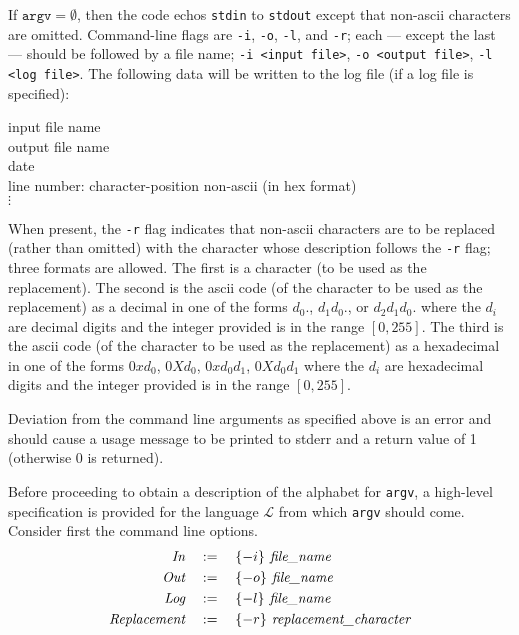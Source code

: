 \documentclass[12pt]{article}
\newcommand{\tab}{\hspace*{2em}}
\newcommand{\mtab}{\hspace*{1em}}
\newcommand{\as}[1] {\begin{align*}#1\end{align*}}
\newcommand{\adef}{&\mtab:=\mtab}
\begin{document}
\tab\begin{minipage}{\linewidth-12\fboxsep}
    If $ \texttt{argv} = \emptyset $, then the code echos \texttt{stdin} to \texttt{stdout} except 
    that non-ascii characters are omitted. Command-line flags are \texttt{-i}, \texttt{-o}, \texttt{-l}, 
    and \texttt{-r}; each --- except the last --- should be followed by a file name; \texttt{-i <input file>}, 
    \texttt{-o <output file>}, \texttt{-l <log file>}. The following data will be written to the log file 
    (if a log file is specified): \bigskip

    \tab\tab\begin{minipage}{\linewidth-24\fboxsep}
        input file name \\
        output file name \\
        date \\
        line number: character-position non-ascii (in hex format) \\
        \tab $ \vdots $
    \end{minipage} \hfill \bigskip \bigskip

    When present, the \texttt{-r} flag indicates that non-ascii characters are to be replaced (rather
    than omitted) with the character whose description follows the \texttt{-r} flag; three formats
    are allowed. The first is a character (to be used as the replacement). The second is the
    ascii code (of the character to be used as the replacement) as a decimal in one of the forms 
    $ d_0 . $, $ d_1 d_0 . $, or $ d_2 d_1 d_0 . $ where the $ d_i $ are decimal digits and the integer 
    provided is in the range $ [0, 255] $. The third is the ascii code (of the character to be used as the replacement) 
    as a hexadecimal in one of the forms $ 0x d_0 $, $ 0X d_0 $, $ 0x d_0 d_1 $, $ 0X d_0 d_1 $ where the $ d_i $ 
    are hexadecimal digits and the integer provided is in the range $ [0, 255] $. \bigskip

    Deviation from the command line arguments as specified above is an error and should
    cause a usage message to be printed to stderr and a return value of 1 (otherwise 0 is
    returned).
\end{minipage}

\newpage

Before proceeding to obtain a description of the alphabet for \texttt{argv}, a high-level specification
is provided for the language $ \mathcal{L} $ from which \texttt{argv} should come. Consider first the command
line options.
\as{
    \textit{In} \adef \{-i\} \textit{ file\_name} \\
    \textit{Out} \adef \{-o\} \textit{ file\_name} \\
    \textit{Log} \adef \{-l\} \textit{ file\_name} \\
    \textit{Replacement} \adef \{-r\} \textit{ replacement\_character}
}
\end{document}
